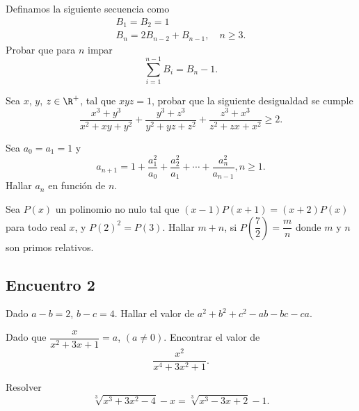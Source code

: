 \begin{section-problem}
    Definamos la siguiente secuencia como
    \begin{gather*}
        B_1 = B_2 = 1\\
        B_n = 2 B_{n - 2} + B_{n - 1}, \quad n \geq 3.
    \end{gather*}
    Probar que para $n$ impar
    \[\sum_{i = 1}^{n - 1} B_i = B_n - 1.\]
\end{section-problem}

\begin{section-problem}
    Sea $x$, $y$, $z \in \R^+$, tal que $xyz = 1$, probar que la siguiente desigualdad se cumple
    \[\frac{x^3 + y^3}{x^2 + xy + y^2} + \frac{y^3 + z^3}{y^2 + yz + z^2} + \frac{z^3 + x^3}{z^2 + zx + x^2} \geq 2.\]
\end{section-problem}

\begin{section-problem}
    Sea $a_0 = a_1 = 1$ y
    \[a_{n + 1} = 1 + \frac{a^2_1}{a_0} + \frac{a^2_2}{a_1} + \cdots + \frac{a^2_n}{a_{n - 1}}, n \geq 1.\]
    Hallar $a_n$ en función de $n$.
\end{section-problem}

\begin{section-problem}
    Sea $P(x)$ un polinomio no nulo tal que $(x - 1)P(x + 1) = (x + 2)P(x)$ para todo real $x$, y $P(2)^2 = P(3)$.
    Hallar $m + n$, si $P\left(\dfrac{7}{2}\right) = \dfrac{m}{n}$ donde $m$ y $n$ son primos relativos.
\end{section-problem}





\subsection{Encuentro 2}

\begin{section-problem}
    Dado $a - b = 2$, $b - c = 4$.
    Hallar el valor de $a^2 + b^2 + c^2 - ab - bc - ca$.
\end{section-problem}

\begin{section-problem}
    Dado que $\dfrac{x}{x^2 + 3x + 1} = a$, $(a \neq 0)$.
    Encontrar el valor de
    \[\frac{x^2}{x^4 + 3x^2 + 1}.\]
\end{section-problem}

\begin{section-problem}
    Resolver
    \[\sqrt[3]{x^3 + 3x^2 - 4} - x = \sqrt[3]{x^3 - 3x + 2} - 1.\]
\end{section-problem}

